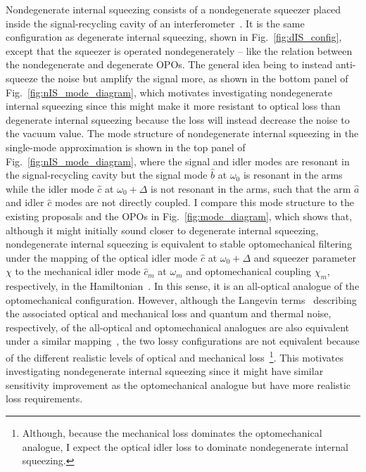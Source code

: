 Nondegenerate internal squeezing consists of a nondegenerate squeezer placed inside the signal-recycling cavity of an interferometer~\cite{}. It is the same configuration as degenerate internal squeezing, shown in Fig.~\ref{fig:dIS_config}, except that the squeezer is operated nondegenerately -- like the relation between the nondegenerate and degenerate OPOs. The general idea being to instead anti-squeeze the noise but amplify the signal more, as shown in the bottom panel of Fig.~\ref{fig:nIS_mode_diagram}, which motivates investigating nondegenerate internal squeezing since this might make it more resistant to optical loss than degenerate internal squeezing because the loss will instead decrease the noise to the vacuum value. %
The mode structure of nondegenerate internal squeezing in the single-mode approximation is shown in the top panel of Fig.~\ref{fig:nIS_mode_diagram}, where the signal and idler modes are resonant in the signal-recycling cavity but the signal mode $\hat b$ at $\omega_0$ is resonant in the arms while the idler mode $\hat c$ at $\omega_0+\Delta$ is not resonant in the arms, such that the arm $\hat a$ and idler $\hat c$ modes are not directly coupled. I compare this mode structure to the existing proposals and the OPOs in Fig.~\ref{fig:mode_diagram}, which shows that, although it might initially sound closer to degenerate internal squeezing, nondegenerate internal squeezing is equivalent to stable optomechanical filtering under the mapping of the optical idler mode $\hat c$ at $\omega_0+\Delta$ and squeezer parameter $\chi$ to the mechanical idler mode $\hat{c}_m$ at $\omega_m$  and optomechanical coupling $\chi_m$, respectively, in the Hamiltonian~\cite{liBroadbandSensitivityImprovement2020}. In this sense, it is an all-optical analogue of the optomechanical configuration.
However, although the Langevin terms~\cite{} describing the associated optical and mechanical loss and quantum and thermal noise, respectively, of the all-optical and optomechanical analogues are also equivalent under a similar mapping~\cite{}, the two lossy configurations are not equivalent because of the different realistic levels of optical and mechanical loss~\footnote{Although, because the mechanical loss dominates the optomechanical analogue, I expect the optical idler loss to dominate nondegenerate internal squeezing.}. This motivates investigating nondegenerate internal squeezing since it might have similar sensitivity improvement as the optomechanical analogue but have more realistic loss requirements. %

